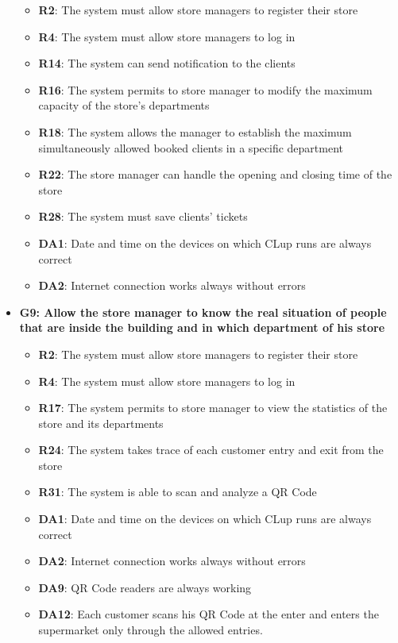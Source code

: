\documentclass{article}
\begin{document}
\begin{itemize}
\begin{itemize}
						\item {\bfseries R2}: The system must allow store managers to register their store
						\item {\bfseries R4}: The system must allow store managers to log in
						\item {\bfseries R14}: The system can send notification to the clients
						\item {\bfseries R16}: The system permits to store manager to modify the maximum capacity of the store's departments 
						\item {\bfseries R18}: The system allows the manager to establish the maximum simultaneously allowed booked clients in a specific department
						\item {\bfseries R22}: The store manager can handle the opening and closing time of the store
						\item {\bfseries R28}: The system must save clients’ tickets \\
		
						\item {\bfseries DA1}: Date and time on the devices on which CLup runs are always correct
						\item {\bfseries DA2}: Internet connection works always without errors
						
					\end{itemize}	

				\item {\bfseries G9: Allow the store manager to know the real situation of people that are inside the building and in which department of his store}	

					\begin{itemize}
						
						\item {\bfseries R2}: The system must allow store managers to register their store
						\item {\bfseries R4}: The system must allow store managers to log in
						\item {\bfseries R17}: The system permits to store manager to view the statistics of the store and its departments
						\item {\bfseries R24}: The system takes trace of each customer entry and exit from the store
						\item {\bfseries R31}: The system is able to scan and analyze a QR Code \\		
				
						\item {\bfseries DA1}: Date and time on the devices on which CLup runs are always correct
						\item {\bfseries DA2}: Internet connection works always without errors
						\item {\bfseries DA9}: QR Code readers are always working
						\item {\bfseries DA12}: Each customer scans his QR Code at the enter and enters the supermarket only through the allowed entries.
							

\end{itemize}
\end{itemize}
\end{document}
